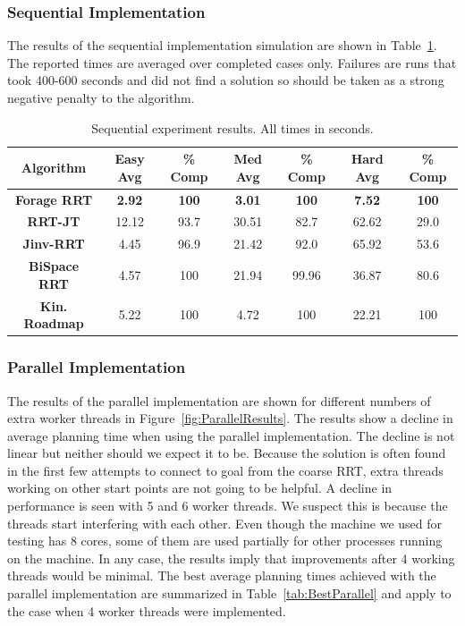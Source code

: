 \documentclass[conference]{IEEEtran}
\begin{document}
\subsubsection{Sequential Implementation}
The results of the sequential implementation simulation are shown in Table~\ref{tab:Results}. The reported times are averaged over completed
cases only. Failures are runs that took 400-600 seconds and did not find a solution so should be taken as a strong negative penalty to the
algorithm.

\begin{table}
        \centering
        \begin{tabular}{| c | c | c | c | c | c | c | }
		\hline
                Algorithm & \textbf{Easy Avg} & \textbf{\% Comp} &\textbf{Med Avg} & \textbf{\% Comp} & \textbf{Hard Avg} & \textbf{\% Comp}\\  \hline
                \textbf{Forage RRT}&\textbf{2.92}&\textbf{100}&\textbf{3.01}&\textbf{100}&\textbf{7.52}&\textbf{100}\\ \hline
                \textbf{RRT-JT}&12.12&93.7&30.51&82.7&62.62&29.0\\ \hline
                \textbf{Jinv-RRT}&4.45&96.9&21.42&92.0&65.92&53.6\\ \hline
		\textbf{BiSpace RRT}&4.57&100&21.94&99.96&36.87&80.6\\ \hline
   		\textbf{Kin. Roadmap}&5.22&100&4.72&100&22.21&100\\ \hline
        \end{tabular}
        \caption{Sequential experiment results. All times in seconds.}
        \label{tab:Results}
\end{table}

\subsubsection{Parallel Implementation}
The results of the parallel implementation are shown for different numbers of extra worker threads in Figure~\ref{fig:ParallelResults}. The
results show a decline in average planning time when using the parallel implementation. The decline is not linear but neither should we
expect it to be. Because the solution is often found in the first few attempts to connect to goal from the coarse RRT, extra threads working
on other start points are not going to be helpful. A decline in performance is seen with 5 and 6 worker threads. We suspect this is because
the threads start interfering with each other. Even though the machine we used for testing has 8 cores, some of them are used partially for
other processes running on the machine. In any case, the results imply that improvements after 4 working threads would be minimal. The best
average planning times achieved with the parallel implementation are summarized in Table~\ref{tab:BestParallel} and apply to the case when 4
worker threads were implemented.
\end{document}
